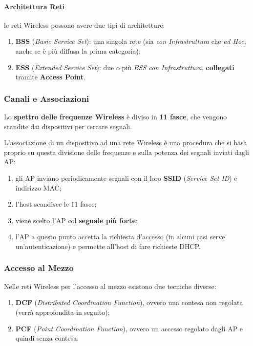 \documentclass[a4paper]{article}
\begin{document}
		\paragraph{Architettura Reti}
			le reti Wireless possono avere due tipi di architetture:
			\begin{enumerate}
				\item \textbf{BSS} (\emph{Basic Service Set}): una singola rete (sia \emph{con Infrastruttura} che \emph{ad Hoc}, anche se è più diffusa la prima categoria);
				\item \textbf{ESS} (\emph{Extended Service Set}): due o più \emph{BSS con Infrastruttura}, \textbf{collegati} tramite \textbf{Access Point}.
			\end{enumerate}
			
		
		\subsubsection{Canali e Associazioni}
			
			Lo \textbf{spettro delle frequenze Wireless} è diviso in \textbf{11 fasce}, che vengono scandite dai dispositivi per cercare segnali.
			
			L'associazione di un dispositivo ad una rete Wireless è una procedura che si basa proprio su questa divisione delle frequenze e sulla potenza dei segnali inviati dagli AP:
			\begin{enumerate}
				\item gli AP inviano periodicamente segnali con il loro \textbf{SSID} (\emph{Service Set ID}) e indirizzo MAC;
				\item l'host scandisce le 11 fasce;
				\item viene scelto l'AP col \textbf{segnale più forte};
				\item l'AP a questo punto accetta la richiesta d'accesso (in alcuni casi serve un'autenticazione) e permette all'host di fare richieste DHCP.
			\end{enumerate}				
		
		
		\subsubsection{Accesso al Mezzo}
		
			Nelle reti Wireless per l'accesso al mezzo esistono due tecniche diverse:
			\begin{enumerate}
				\item \textbf{DCF} (\emph{Distributed Coordination Function}), ovvero una contesa non regolata (verrà approfondita in seguito);
				\item \textbf{PCF} (\emph{Point Coordination Function}), ovvero un accesso regolato dagli AP e quindi senza contesa.
			\end{enumerate}
\end{document}
